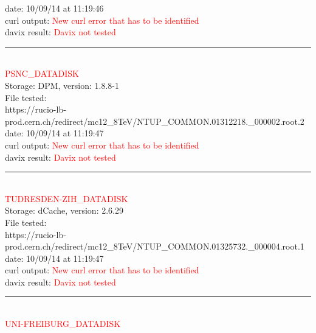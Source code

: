date: 10/09/14 at 11:19:46\\

curl output:  \textcolor{red}{New curl error that has to be identified}\\

davix result:  \textcolor{red}{Davix not tested}\\

\rule{\textwidth}{1pt}\\

\textcolor{red}{\normalsize{PSNC\_DATADISK}}\\

Storage: DPM, version: 1.8.8-1\\

File tested:\\
\footnotesize{https://rucio-lb-prod.cern.ch/redirect/mc12\_8TeV/NTUP\_COMMON.01312218.\_000002.root.2}\\

date: 10/09/14 at 11:19:47\\

curl output:  \textcolor{red}{New curl error that has to be identified}\\

davix result:  \textcolor{red}{Davix not tested}\\

\rule{\textwidth}{1pt}\\

\textcolor{red}{\normalsize{TUDRESDEN-ZIH\_DATADISK}}\\

Storage: dCache, version: 2.6.29\\

File tested:\\
\footnotesize{https://rucio-lb-prod.cern.ch/redirect/mc12\_8TeV/NTUP\_COMMON.01325732.\_000004.root.1}\\

date: 10/09/14 at 11:19:47\\

curl output:  \textcolor{red}{New curl error that has to be identified}\\

davix result:  \textcolor{red}{Davix not tested}\\

\rule{\textwidth}{1pt}\\

\textcolor{red}{\normalsize{UNI-FREIBURG\_DATADISK}}\\


